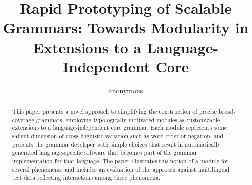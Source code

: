 %

\newcommand{\hpsg}{\textsc{hpsg}}
\newcommand{\lkb}{\textsc{lkb}}
\newcommand{\lfg}{\textsc{lfg}}





\title{Rapid Prototyping of Scalable Grammars: Towards Modularity in Extensions to a Language-Independent Core}

\author{anonymous}


\maketitle

\begin{abstract}
This paper presents a novel approach to simplifying the construction of 
precise broad-coverage grammars, employing typologically-motivated modules
as customizable extensions to a language-independent core grammar.  Each
module represents some salient dimension of cross-linguistic variation such
as word order or negation, and presents the grammar developer with simple 
choices that result in automatically generated language-specific software 
that becomes part of the grammar implementation for that language.  The 
paper illustrates this notion of a module for several phenomena, and 
includes an evaluation of the approach against multilingual test data
reflecting interactions among these phenomena.
\end{abstract}
%

